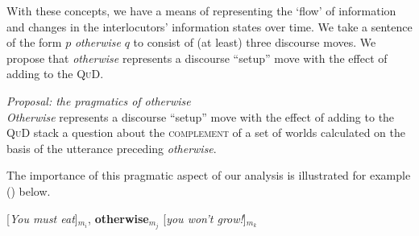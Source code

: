With these concepts, we have a means of representing the `flow' of information and changes in the interlocutors' information states over time. We take a sentence of the form $ p $ \textit{otherwise} $ q $ to consist of (at least) three discourse moves. We propose that \textit{otherwise} represents a discourse ``setup'' move with the effect of adding to the \textsc{QuD}. 

\pex  \emph{Proposal: the pragmatics of \emph{otherwise}}\\
\textit{Otherwise} represents a discourse ``setup'' move with the effect of adding to the \textsc{QuD} stack a question about the \textsc{complement} of a set of worlds calculated on the basis of the utterance preceding \textit{otherwise}.\xe

The importance of this pragmatic aspect of our analysis is illustrated for example (\nextx) below. 


\pex  \label{eat} [\textit{You must eat}]$_{m_i}$, \textbf{otherwise}$ _{m_j} $ [\textit{you won't grow!}]$_{m_k}$\xe


